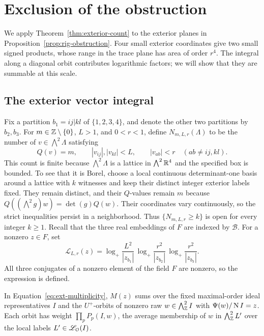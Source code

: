 \section{Exclusion of the obstruction}\label{sec:conclusion}

We apply Theorem~\ref{thm:exterior-count} to the exterior planes in
Proposition~\ref{prop:rig-obstruction}.  Four small exterior coordinates
give two small signed products, whose range in the trace plane has area
of order $r^4$.  The integral along a diagonal orbit contributes
logarithmic factors; we will show that they are summable at this scale.

\subsection{The exterior vector integral}

Fix a partition $b_1=ij|kl$ of $\{1,2,3,4\}$, and denote the other two
partitions by $b_2,b_3$.  For $m\in\mathbb Z\setminus\{0\}$, $L>1$, and
$0<r<1$, define $N_{m,L,r}(\Lambda)$ to be the number of
$v\in\bigwedge^2\Lambda$ satisfying
\begin{equation}\label{eq:end-vector-box}
 Q(v)=m,\qquad |v_{ij}|,|v_{kl}|<L,\qquad
 |v_{ab}|<r\quad(ab\ne ij,kl).
\end{equation}
This count is finite because $\bigwedge^2\Lambda$ is a lattice in
$\bigwedge^2\mathbb R^4$ and the specified box is bounded.  To see that it is
Borel, choose a local continuous determinant-one basis around a lattice
with $k$ witnesses and keep their distinct integer exterior labels fixed.
They remain distinct, and their $Q$-values remain $m$ because
$Q((\bigwedge^2g)w)=\det(g)Q(w)$.  Their coordinates vary continuously,
so the strict inequalities persist in a neighborhood.  Thus
$\{N_{m,L,r}\ge k\}$ is open for every integer $k\ge1$.
Recall that the three real embeddings of $F$ are indexed by
$\mathcal B$.  For a nonzero $z\in F$, set
\begin{equation}\label{eq:end-logarithms}
 \mathcal L_{L,r}(z)
  =\log_+\frac{L^2}{|z_{b_1}|}\,
   \log_+\frac{r^2}{|z_{b_2}|}\,
   \log_+\frac{r^2}{|z_{b_3}|}.
\end{equation}
All three conjugates of a nonzero element of the field $F$ are nonzero,
so the expression is defined.

In Equation~\eqref{eq:ext-multiplicity}, $M(z)$ sums over
the fixed maximal-order ideal representatives $I$ and the $U^+$-orbits
of nonzero raw $w\in\bigwedge^2_{\mathbb Z}I$ with $\Psi(w)/\operatorname{N} I=z$.  Each
orbit has weight $\prod_pP_p(I,w)$, the average membership of $w$ in
$\bigwedge^2_{\mathbb Z}L'$ over the local labels
$L'\in\mathscr L_{\mathcal O}(I)$.

